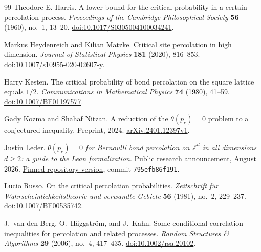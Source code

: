 \documentclass[11pt]{article}
\theoremstyle{definition}
\theoremstyle{remark}
\numberwithin{equation}{section}
\begin{document}
\begin{thebibliography}{99}
Theodore E. Harris.
A lower bound for the critical probability in a certain percolation process.
\emph{Proceedings of the Cambridge Philosophical Society}
\textbf{56} (1960), no.~1, 13--20.
\href{https://doi.org/10.1017/S0305004100034241}{doi:10.1017/S0305004100034241}.

Markus Heydenreich and Kilian Matzke.
Critical site percolation in high dimension.
\emph{Journal of Statistical Physics} \textbf{181} (2020), 816--853.
\href{https://doi.org/10.1007/s10955-020-02607-y}{doi:10.1007/s10955-020-02607-y}.

Harry Kesten.
The critical probability of bond percolation on the square lattice equals $1/2$.
\emph{Communications in Mathematical Physics} \textbf{74} (1980), 41--59.
\href{https://doi.org/10.1007/BF01197577}{doi:10.1007/BF01197577}.

Gady Kozma and Shahaf Nitzan.
A reduction of the $\theta(p_c)=0$ problem to a conjectured inequality.
Preprint, 2024.
\href{https://arxiv.org/abs/2401.12397v1}{arXiv:2401.12397v1}.

Justin Leder.
\emph{$\theta(p_c)=0$ for Bernoulli bond percolation on $\mathbb Z^d$
in all dimensions $d\ge2$: a guide to the Lean formalization}.
Public research announcement, August 2026.
\href{https://github.com/anthropics/formal-math/blob/795efb86f191735c5481675763537cfb4ff37e55/percolation/summary.pdf}{Pinned repository version},
commit \texttt{795efb86f191}.

Lucio Russo.
On the critical percolation probabilities.
\emph{Zeitschrift f\"ur Wahrscheinlichkeitstheorie und verwandte Gebiete}
\textbf{56} (1981), no.~2, 229--237.
\href{https://doi.org/10.1007/BF00535742}{doi:10.1007/BF00535742}.

J.~van den Berg, O.~H\"aggstr\"om, and J.~Kahn.
Some conditional correlation inequalities for percolation and related processes.
\emph{Random Structures \& Algorithms} \textbf{29} (2006), no.~4, 417--435.
\href{https://doi.org/10.1002/rsa.20102}{doi:10.1002/rsa.20102}.

\end{thebibliography}
\end{document}
